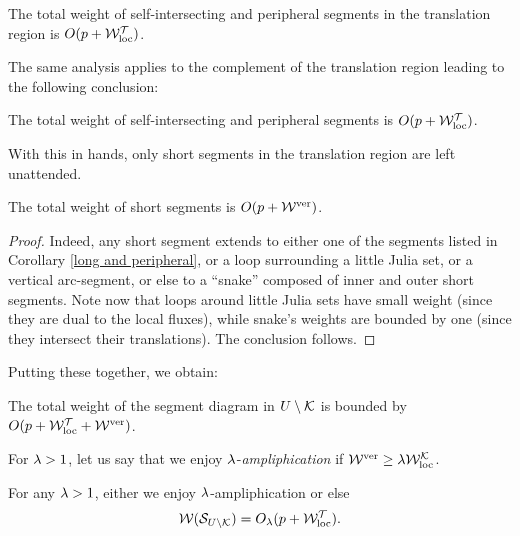 \begin{cor}
  The total weight of self-intersecting and peripheral segments in the
  translation region is
  $O(p+{\mathcal W}_{\mathrm{loc}}^{\mathcal T})$. 
\end{cor}  


The same analysis applies to the complement of the translation region
 leading to the following conclusion:

\begin{cor}\label{long and peripheral} 
  The total weight of self-intersecting and peripheral segments   is
   $O(p+{\mathcal W}_{\mathrm{loc}}^{\mathcal T})$. 
\end{cor}

With this in hands, only short segments in the translation region are left unattended.

\begin{lem}
  The total weight of short segments is $O(p+{\mathcal W}^{\mathrm {ver}})$.
\end{lem}

\begin{proof}
Indeed, any short segment extends to either one of the segments listed
in Corollary \ref{long and peripheral},
or a loop surrounding a little Julia set, 
or  a vertical arc-segment,
or else to a ``snake'' composed of inner and outer short segments.
Note now that
loops around little Julia sets have small weight
(since they are dual to the local fluxes),
while snake's weights are bounded  by one (since they
intersect their translations). The conclusion follows. 
\end{proof}  

Putting these together, we obtain:

\begin{cor}\label{total segments weight}
  The total weight of the segment diagram in $U\setminus {\mathcal K}$ is
  bounded by  $O(p + {\mathcal W}^{\mathcal T}_{\mathrm{loc}} + {\mathcal W}^{\mathrm {ver}})$.
\end{cor}

For ${\lambda}>1$, let us say that we  enjoy ${\lambda}$-{\em ampliphication} if
$ {\mathcal W}^{\mathrm {ver}} \geq {\lambda} {\mathcal W}^{\mathcal K}_{\mathrm{loc}}$. 

\begin{cor}\label{total segments weight 2}
 For any ${\lambda}>1$,  either we enjoy ${\lambda}$-ampliphication 
  or else
  $$ {\mathcal W}({\mathcal S}_{U\setminus {\mathcal K} }) = O_{\lambda} (p + {\mathcal W}^{\mathcal T}_{\mathrm{loc}} ). $$
\end{cor}



